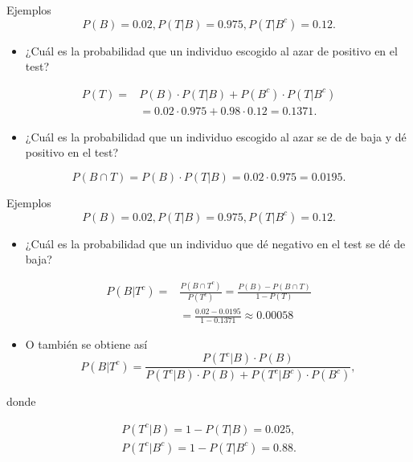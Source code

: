 \documentclass[
  ignorenonframetext,
]{beamer}
\providecommand{\tightlist}{%
  \setlength{\itemsep}{0pt}\setlength{\parskip}{0pt}}
\begin{document}
\begin{frame}{Ejemplos}
\protect\hypertarget{ejemplos-10}{}
\[P(B)=0.02, P(T|B)=0.975, P(T|B^c)=0.12.\]

\begin{itemize}
\tightlist
\item
  ¿Cuál es la probabilidad que un individuo escogido al azar de positivo
  en el test?
\end{itemize}

\[
\begin{array}{rl}
P(T) = & P(B)\cdot P(T|B)+P(B^c)\cdot P(T|B^c)\\[1ex]
& =0.02\cdot 0.975+0.98\cdot 0.12=0.1371.
\end{array}
\]

\begin{itemize}
\tightlist
\item
  ¿Cuál es la probabilidad que un individuo escogido al azar se de de
  baja y dé positivo en el test?
\end{itemize}

\[P(B\cap T)= P(B)\cdot P(T|B)=0.02\cdot 0.975=0.0195.\]
\end{frame}

\begin{frame}{Ejemplos}
\protect\hypertarget{ejemplos-11}{}
\[P(B)=0.02, P(T|B)=0.975, P(T|B^c)=0.12.\]

\begin{itemize}
\tightlist
\item
  ¿Cuál es la probabilidad que un individuo que dé negativo en el test
  se dé de baja?
\end{itemize}

\[
\begin{array}{rl}
P(B|T^c)= &\displaystyle \frac{P(B\cap T^c)}{P(T^c)}=
\frac{P(B)-P(B\cap T)}{1-P(T)}\\[2ex] & \displaystyle =
\frac{0.02-0.0195}{1-0.1371}\approx 0.00058
\end{array}
\]

\begin{itemize}
\tightlist
\item
  O también se obtiene así \[
  P(B|T^c)=\frac{P(T^c|B)\cdot P(B)}{P(T^c|B)\cdot P(B)+P(T^c|B^c)\cdot P(B^c)},
  \]
\end{itemize}

donde

\[
\begin{array}{l}
P(T^c|B)=1-P(T|B)=0.025,\\[1ex] P(T^c|B^c)=1-P(T|B^c)=0.88.
\end{array}
\]
\end{frame}
\end{document}
